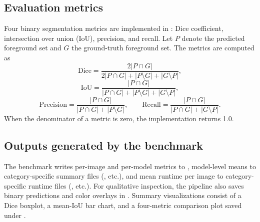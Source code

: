 \subsection{Evaluation metrics}
Four binary segmentation metrics are implemented in : Dice coefficient, intersection over union (IoU), precision, and recall. Let \(P\) denote the predicted foreground set and \(G\) the ground-truth foreground set. The metrics are computed as
\[
\mathrm{Dice} = \frac{2|P \cap G|}{2|P \cap G| + |P \setminus G| + |G \setminus P|},
\]
\[
\mathrm{IoU} = \frac{|P \cap G|}{|P \cap G| + |P \setminus G| + |G \setminus P|},
\]
\[
\mathrm{Precision} = \frac{|P \cap G|}{|P \cap G| + |P \setminus G|},
\qquad
\mathrm{Recall} = \frac{|P \cap G|}{|P \cap G| + |G \setminus P|}.
\]
When the denominator of a metric is zero, the implementation returns 1.0.

\subsection{Outputs generated by the benchmark}
The benchmark writes per-image and per-model metrics to , model-level means to category-specific summary files (, etc.), and mean runtime per image to category-specific runtime files (, etc.). For qualitative inspection, the pipeline also saves binary predictions and color overlays in . Summary visualizations consist of a Dice boxplot, a mean-IoU bar chart, and a four-metric comparison plot saved under .

